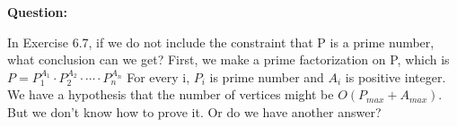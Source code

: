 \documentclass{article} %
\begin{document}
	
	\textbf{Question:}\par
	In Exercise 6.7, if we do not include the constraint that P is a prime number, what conclusion can we get? First, we make a prime factorization on P, which is $P=P_1^{A_1}\cdot P_2^{A_2}\cdot \cdots \cdot P_n^{A_n}$
  	For every i, $P_i$ is prime number and $A_i$ is positive integer.
	We have a hypothesis that the number of vertices might be $O(P_{max}+A_{max})$. But we don’t know how to prove it. Or do we have another answer?
\end{document}
